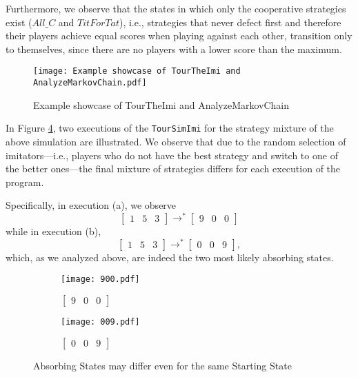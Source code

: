 Furthermore, we observe that the states in which only the cooperative strategies exist ($All\_C$ and $TitForTat$), i.e., strategies that never defect first and therefore their players achieve equal scores when playing against each other, transition only to themselves, since there are no players with a lower score than the maximum.


	\begin{figure}[h]
	      \centering
	      \texttt{[image: Example showcase of TourTheImi and AnalyzeMarkovChain.pdf]}
	      \caption{Example showcase of TourTheImi and AnalyzeMarkovChain}
	      \label{fig:TourTheImi153}
	\end{figure}
	
In Figure \ref{fig:TourSimImi153}, two executions of the \texttt{TourSimImi} for the strategy mixture of the above simulation are illustrated. We observe that due to the random selection of imitators—i.e., players who do not have the best strategy and switch to one of the better ones—the final mixture of strategies differs for each execution of the program. 

Specifically, in execution (a), we observe 
\[
\begin{bmatrix}1 & 5 & 3\end{bmatrix} \rightarrow^* \begin{bmatrix}9 & 0 & 0\end{bmatrix}
\]
while in execution (b),
\[
\begin{bmatrix}1 & 5 & 3\end{bmatrix} \rightarrow^* \begin{bmatrix}0 & 0 & 9\end{bmatrix},
\]
which, as we analyzed above, are indeed the two most likely absorbing states.

	\begin{figure}[h]
		\centering
		\begin{subfigure}{.5\textwidth}
			\centering
	      	\texttt{[image: 900.pdf]}
			\caption{$\begin{bmatrix}9&0&0\end{bmatrix}$}
	      	\label{fig:900}
		\end{subfigure}%
		\begin{subfigure}{.5\textwidth}
			\centering
	      	\texttt{[image: 009.pdf]}
			\caption{$\begin{bmatrix}0&0&9\end{bmatrix}$}
	      	\label{fig:009}
		\end{subfigure}
		\caption{Absorbing States may differ even for the same Starting State}
		\label{fig:TourSimImi153}
	\end{figure}

